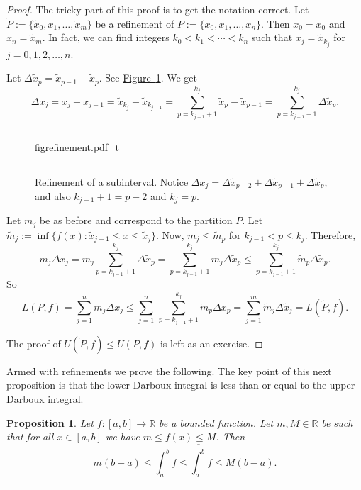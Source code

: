 \documentclass[12pt]{book}
\newenvironment{myfigureht}{%
\begin{figure}[h!t]
\noindent\rule{\textwidth}{0.4pt}\vspace{12pt}\par\centering}%
{\par\noindent\rule{\textwidth}{0.4pt}
\end{figure}}
\newcommand{\R}{{\mathbb{R}}}
\theoremstyle{plain}
\newtheorem{prop}[thm]{Proposition}
\theoremstyle{remark}
\theoremstyle{definition}
\theoremstyle{exercise}
\theoremstyle{example}
\newcommand{\figureref}[1]{\hyperref[#1]{Figure~\ref*{#1}}}
\begin{document}
\begin{proof}
The tricky part of this proof is to get the notation correct.
Let $\widetilde{P} := \{ \widetilde{x}_0, \widetilde{x}_1, \ldots,
\widetilde{x}_m \}$ be
a refinement of 
$P := \{ x_0, x_1, \ldots, x_n \}$.  Then
$x_0 = \widetilde{x}_0$ and 
$x_n = \widetilde{x}_m$.  In fact, we can find integers
$k_0 < k_1 < \cdots < k_n$ such that $x_j = \widetilde{x}_{k_j}$ for
$j=0,1,2,\ldots,n$.

Let $\Delta \widetilde{x}_p = \widetilde{x}_{p-1} - \widetilde{x}_p$.
See \figureref{fig:refinement}.
We get 
\begin{equation*}
\Delta x_j
=
x_j - x_{j-1} =
\widetilde{x}_{k_j} - \widetilde{x}_{k_{j-1}} =
\sum_{p=k_{j-1}+1}^{k_j} 
\widetilde{x}_{p} - \widetilde{x}_{p-1}
=
\sum_{p=k_{j-1}+1}^{k_j} \Delta \widetilde{x}_p .
\end{equation*}
\begin{myfigureht}
{figrefinement.pdf_t}
\caption{Refinement of a subinterval.  Notice $\Delta x_j =
\Delta \widetilde{x}_{p-2} +
\Delta \widetilde{x}_{p-1} +
\Delta \widetilde{x}_{p}$,
and also
$k_{j-1}+1 = p-2$ and
$k_{j} = p$.\label{fig:refinement}}
\end{myfigureht}

Let $m_j$ be as before and correspond to the partition $P$.
Let $\widetilde{m}_j := \inf \{ f(x) : \widetilde{x}_{j-1} \leq x \leq
\widetilde{x}_j \}$.
Now, $m_j \leq \widetilde{m}_p$ for $k_{j-1} < p \leq k_j$.  Therefore,
\begin{equation*}
m_j \Delta x_j
=
m_j \sum_{p=k_{j-1}+1}^{k_j} \Delta \widetilde{x}_p
=
\sum_{p=k_{j-1}+1}^{k_j} m_j \Delta \widetilde{x}_p
\leq
\sum_{p=k_{j-1}+1}^{k_j} \widetilde{m}_p \Delta \widetilde{x}_p .
\end{equation*}
So
\begin{equation*}
L(P,f) =
\sum_{j=1}^n m_j \Delta x_j
\leq
\sum_{j=1}^n \,
\sum_{p=k_{j-1}+1}^{k_j} \widetilde{m}_p \Delta \widetilde{x}_p
=
\sum_{j=1}^m
\widetilde{m}_j \Delta \widetilde{x}_j = L(\widetilde{P},f).
\end{equation*}

The proof of $U(\widetilde{P},f) \leq U(P,f)$ is left as an exercise.
\end{proof}

Armed with refinements we prove the following.
The key point of this next proposition is that
the lower Darboux integral is less than or equal to the upper Darboux
integral.

\begin{prop} \label{intulbound:prop}
Let $f \colon [a,b] \to \R$ be a bounded function.  Let $m, M \in \R$ be 
such that for all $x \in [a,b]$ we have $m \leq f(x) \leq M$.  Then
\begin{equation}
\label{intulbound:eq}
m(b-a) \leq
\underline{\int_a^b} f \leq \overline{\int_a^b} f
\leq M(b-a) .
\end{equation}
\end{prop}
\end{document}
